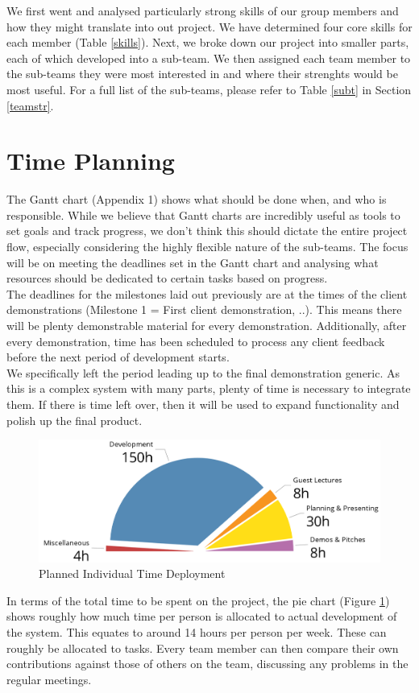 \documentclass[a4paper,10pt,DIV10,openright,openbib]{scrreprt}
\begin{document}
We first went and analysed particularly strong skills of our group members and how they might translate 
into out project. We have determined four core skills for each member (Table \ref{skills}). Next, we broke down
our project into smaller parts, each of which developed into a sub-team. We then assigned each team member 
to the sub-teams they were most interested in and where their strenghts would be most useful. For a full
list of the sub-teams, please refer to Table \ref{subt} in Section \ref{teamstr}.


\section{Time Planning}



The Gantt chart (Appendix 1) shows what should be done when, and who is responsible.
While we believe that Gantt charts are incredibly useful as tools to set goals and track
progress, we don't think this should dictate the entire project flow, especially considering
the highly flexible nature of the sub-teams. The focus will be on meeting the deadlines set
in the Gantt chart and analysing what resources should be dedicated to certain
tasks based on progress.\\
The deadlines for the milestones laid out previously are at the times of the client demonstrations (Milestone 1 = 
First client demonstration, ..). 
This means there will be plenty demonstrable material for every demonstration. Additionally,
after every demonstration, time has been scheduled to process any client feedback before the
next period of development starts.\\
We specifically left the period leading up to the final demonstration generic.
As this is a complex system with many parts, plenty of time is necessary to integrate them.
If there is time left over, then it will be used to expand functionality and polish up the final product.\\
\begin{figure}[h]
  \includegraphics[width=\textwidth]{pie.png}
  \caption{Planned Individual Time Deployment}
  \label{piec}
\end{figure}
In terms of the total time to be spent on the project, the pie chart (Figure \ref{piec}) shows roughly how
much time per person is allocated to actual development of the system. This equates to around
14 hours per person per week. These can roughly be allocated to tasks. Every
team member
can then  compare their own contributions against those of others on the team, discussing any
problems in the regular meetings.
\end{document}
